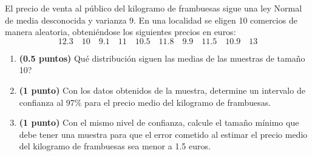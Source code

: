 
El precio de venta al público del kilogramo de frambuesas sigue una ley
Normal de media desconocida y varianza 9. En una localidad se eligen 10
comercios de manera aleatoria, obteniéndose los siguientes precios en euros:
\[
12.3\quad 10\quad 9.1\quad 11\quad 10.5\quad 11.8\quad 9.9\quad
11.5\quad 10.9\quad 13
\]
\begin{enumerate}[label=\alph*)]
  \item \textbf{(0.5 puntos)} \textquestiondown{}Qué distribución siguen
  las medias de las muestras de tamaño 10?
  \item \textbf{(1 punto)} Con los datos obtenidos de la muestra, determine
  un intervalo de confianza al 97\% para el precio medio del kilogramo de frambuesas.
  \item \textbf{(1 punto)} Con el mismo nivel de confianza, calcule el tamaño
  mínimo que debe tener una muestra para que el error cometido al estimar
  el precio medio del kilogramo de frambuesas sea menor a 1.5 euros.
\end{enumerate}
